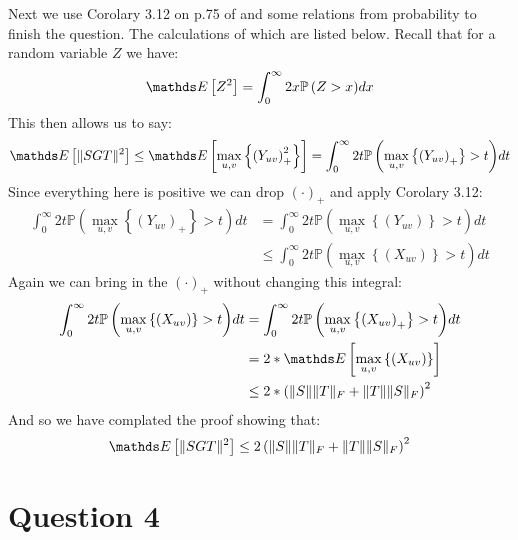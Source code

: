 Next we use Corolary 3.12 on p.75 of \cite{Ledoux2011Probability} and some relations from probability to finish the question. The calculations of which
are listed below. Recall that for a random variable $Z$ we have:
\begin{equation*}
    \pexp{Z^2} = \int_{0}^{\infty}{2x\mathbb{P}\left(Z > x \right)} dx
\end{equation*}
This then allows us to say:
\begin{align*}
    \pexp{\norm{SGT}^2} \leq \pexp{\underset{u,v}{\max}\left\{ \left(Y_{uv}\right)_{+}^2 \right \}} = \int_{0}^{\infty}{2t\mathbb{P}\left(\underset{u,v}{\max}\left\{ \left(Y_{uv}\right)_{+} \right\} > t \right)} dt 
\end{align*}
Since everything here is positive we can drop $(\cdot)_{+}$ and apply Corolary 3.12:
\begin{align*}
    \int_{0}^{\infty}{2t\mathbb{P}\left(\underset{u,v}{\max}\left\{ \left(Y_{uv}\right)_{+} \right\} > t \right)} dt  &= \int_{0}^{\infty}{2t\mathbb{P}\left(\underset{u,v}{\max}\left\{ \left(Y_{uv}\right) \right\} > t \right)} dt \\
                                                                                                                    &\leq \int_{0}^{\infty}{2t\mathbb{P}\left(\underset{u,v}{\max}\left\{ \left(X_{uv}\right) \right\} > t \right)} dt 
\end{align*}
Again we can bring in the $(\cdot)_{+}$ without changing this integral:
\begin{align*}
    \int_{0}^{\infty}{2t\mathbb{P}\left(\underset{u,v}{\max}\left\{ \left(X_{uv}\right) \right\} > t \right)} dt &= \int_{0}^{\infty}{2t\mathbb{P}\left(\underset{u,v}{\max}\left\{ \left(X_{uv}\right)_{+} \right\} > t \right)} dt \\
                                                                                                               &= 2*\pexp{\underset{u,v}{\max}\left\{(X_{uv})\right\}} \\
                                                                                                               &\leq  2*\left( \norm{S}\norm{T}_F +\norm{T}\norm{S}_F\right)^2
\end{align*}
And so we have complated the proof showing that:
\begin{equation*}
    \pexp{\norm{SGT}^2} \leq 2\left( \norm{S}\norm{T}_F +\norm{T}\norm{S}_F\right)^2
\end{equation*}

\section{Question 4}